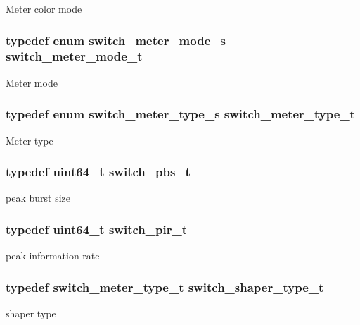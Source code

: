 Meter color mode \hypertarget{group__Meters_ga3fa4bfd778bf4f4b0f4bebef85f70284}{
\subsubsection[{switch\+\_\+meter\+\_\+mode\+\_\+t}]{\setlength{\rightskip}{0pt plus 5cm}typedef enum {\bf switch\+\_\+meter\+\_\+mode\+\_\+s}  {\bf switch\+\_\+meter\+\_\+mode\+\_\+t}}}\label{group__Meters_ga3fa4bfd778bf4f4b0f4bebef85f70284}
Meter mode \hypertarget{group__Meters_ga034a9655e1bdea0a64731ad6e6b375d6}{
\subsubsection[{switch\+\_\+meter\+\_\+type\+\_\+t}]{\setlength{\rightskip}{0pt plus 5cm}typedef enum {\bf switch\+\_\+meter\+\_\+type\+\_\+s}  {\bf switch\+\_\+meter\+\_\+type\+\_\+t}}}\label{group__Meters_ga034a9655e1bdea0a64731ad6e6b375d6}
Meter type \hypertarget{group__Meters_gafe2932127c3ce04089562a657642f3d5}{
\subsubsection[{switch\+\_\+pbs\+\_\+t}]{\setlength{\rightskip}{0pt plus 5cm}typedef uint64\+\_\+t {\bf switch\+\_\+pbs\+\_\+t}}}\label{group__Meters_gafe2932127c3ce04089562a657642f3d5}
peak burst size \hypertarget{group__Meters_gae137996a5fcd00a72cb59367ebb7d711}{
\subsubsection[{switch\+\_\+pir\+\_\+t}]{\setlength{\rightskip}{0pt plus 5cm}typedef uint64\+\_\+t {\bf switch\+\_\+pir\+\_\+t}}}\label{group__Meters_gae137996a5fcd00a72cb59367ebb7d711}
peak information rate \hypertarget{group__Meters_gaf0593a04026dacc8d7cf40c93b990bb5}{
\subsubsection[{switch\+\_\+shaper\+\_\+type\+\_\+t}]{\setlength{\rightskip}{0pt plus 5cm}typedef {\bf switch\+\_\+meter\+\_\+type\+\_\+t} {\bf switch\+\_\+shaper\+\_\+type\+\_\+t}}}\label{group__Meters_gaf0593a04026dacc8d7cf40c93b990bb5}
shaper type 


